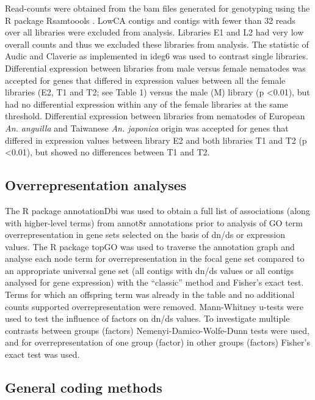 \documentclass[10pt]{bmc_article}
\newenvironment{bmcformat}{\begin{raggedright}\baselineskip20pt\sloppy\setboolean{publ}{false}}{\end{raggedright}\baselineskip20pt\sloppy}
\begin{document}
\begin{bmcformat}
Read-counts were obtained from the bam files generated for genotyping
using the R package Rsamtoools \cite{rsamtools}. LowCA contigs and
contigs with fewer than 32 reads over all libraries were excluded from
analysis. Libraries E1 and L2 had very low overall counts and thus we
excluded these libraries from analysis. The statistic of Audic and
Claverie \cite{pmid9331369} as implemented in ideg6
\cite{pmid12429865} was used to contrast single
libraries. Differential expression between libraries from male versus
female nematodes was accepted for genes that differed in expression
values between all the female libraries (E2, T1 and T2; see Table 1)
versus the male (M) library (p <0.01), but had no differential
expression within any of the female libraries at the same
threshold. Differential expression between libraries from nematodes of
European \textit{An. anguilla} and Taiwanese \textit{An. japonica}
origin was accepted for genes that differed in expression values
between library E2 and both libraries T1 and T2 (p <0.01), but showed
no differences between T1 and T2.

\subsection*{Overrepresentation analyses}

The R package annotationDbi \cite{AnnotationDbi} was used to obtain a
full list of associations (along with higher-level terms) from annot8r
annotations prior to analysis of GO term overrepresentation in gene
sets selected on the basis of dn/ds or expression values. The R
package topGO \cite{topGO} was used to traverse the annotation graph
and analyse each node term for overrepresentation in the focal gene
set compared to an appropriate universal gene set (all contigs with
dn/ds values or all contigs analysed for gene expression) with the
``classic'' method and Fisher's exact test. Terms for which an
offspring term was already in the table and no additional counts
supported overrepresentation were removed. Mann-Whitney u-tests were
used to test the influence of factors on dn/ds values. To investigate
multiple contrasts between groups (factors) Nemenyi-Damico-Wolfe-Dunn
tests were used, and for overrepresentation of one group (factor) in
other groups (factors) Fisher's exact test was used.

\subsection*{General coding methods}


\end{bmcformat}
\end{document}
